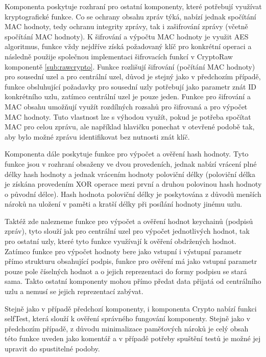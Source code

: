 \documentclass[11pt,final,twoside]{fithesis2}
\begin{document}
Komponenta poskytuje rozhraní pro ostatní komponenty, které potřebují využívat kryptografické funkce. Co se ochrany obsahu zpráv týká, nabízí jednak spočítání MAC hodnoty, tedy ochranu integrity zprávy, 
tak i zašifrování zprávy (včetně spočítání MAC hodnoty). K šifrování a výpočtu MAC hodnoty je využit AES algoritmus, funkce vždy nejdříve získá požadovaný klíč pro konkrétní operaci a následně použije 
společnou implementaci šifrovacích funkcí v CryptoRaw komponentě \ref{sub:rawcrypto}. Funkce rozlišují šifrování (počítání MAC hodnoty) pro sousední uzel a pro centrální uzel, důvod je stejný jako v 
předchozím případě, funkce obsluhující požadavky pro sousední uzly potřebují jako parametr znát ID konkrétního uzlu, zatímco centrální uzel je pouze jeden. Funkce pro šifrování a MAC obsahu umožňují využít rozdílných rozsahů pro šifrovaná a pro výpočet MAC hodnoty. Tuto 
vlastnost lze s výhodou využít, pokud je potřeba spočítat MAC pro celou zprávu, ale například hlavičku ponechat v otevřené podobě tak, 
aby bylo možné zprávu identifikovat bez nutnosti znát klíč. 

Komponenta dále poskytuje funkce pro výpočet a ověření hash hodnoty. Tyto funkce jsou v rozhraní obsaženy ve dvou provedeních, jednak nabízí vrácení plné délky hash hodnoty a jednak vrácením hodnoty 
poloviční délky (poloviční délka je získána provedením XOR operace mezi první a druhou polovinou hash hodnoty o původní délce). Hash hodnota poloviční délky je poskytována z důvodů menších nároků na uložení 
v paměti a kratší délky při posílání hodnoty jinému uzlu. 

Taktéž zde nalezneme funkce pro výpočet a ověření hodnot keychainů (podpisů zpráv), tyto slouží jak pro centrální uzel pro výpočet jednotlivých hodnot, tak pro ostatní uzly, které tyto funkce využívají k 
ověření obdržených hodnot. Zatímco funkce pro výpočet hodnoty bere jako vstupní i výstupní parametr přímo strukturu obsahující podpis, funkce pro ověření má jako vstupní parametr pouze pole číselných hodnot 
a o jejich reprezentaci do formy podpisu se stará sama. Takto ostatní komponenty mohou přímo předat data přijatá od centrálního uzlu a nemusí se jejich reprezentací zabývat.

Stejně jako v případě předchozí komponenty, i komponenta Crypto nabízí funkci selfTest, která slouží k ověření správného fungování komponenty. Stejně jako v předchozím případě, z důvodu minimalizace 
paměťových nároků je celý obsah této funkce uveden jako komentář a v případě potřeby spuštění testů je možné jej upravit do spustitelné podoby.
\end{document}
